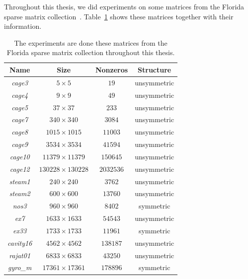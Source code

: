 \documentclass[12pt, twoside]{book}
\begin{document}
Throughout this thesis, we did experiments on some matrices from the Florida sparse
matrix collection~\cite{florida.matrices}. Table~\ref{florida.mats} shows these matrices
together with their information.

\begin{table}
\centering
\begin{tabular}{|c|c|c|c|}
\hline
Name & Size & Nonzeros & Structure\\\hline
\textit{cage3} & $5\times 5$ & $19$ & unsymmetric\\\hline
\textit{cage4} & $9\times 9$ & $49$ & unsymmetric\\\hline
\textit{cage5} & $37\times 37$ & $233$ & unsymmetric\\\hline
\textit{cage7} & $340\times 340$  & $3084$ & unsymmetric\\\hline
\textit{cage8} & $1015\times 1015$  & $11003$ & unsymmetric\\\hline
\textit{cage9} & $3534\times 3534$  & $41594$ & unsymmetric\\\hline
\textit{cage10} & $11379\times 11379$ & $150645$& unsymmetric\\\hline
\textit{cage12} & $130228\times 130228$ &  $2032536$ & unsymmetric\\\hline
\textit{steam1} & $240\times 240$ & $3762$ & unsymmetric \\\hline
\textit{steam2} & $600\times 600$ & $13760$ & unsymmetric \\\hline
\textit{nos3} & $960\times 960$ & $8402$ & symmetric \\\hline
\textit{ex7} & $1633\times 1633$ & $54543$ & unsymmetric \\\hline 
\textit{ex33} & $1733\times 1733$ & $11961$ & symmetric\\\hline
\textit{cavity16} & $4562\times 4562$ & $138187$ & unsymmetric \\\hline
\textit{rajat01} & $6833\times 6833$ & $43250$ & unsymmetric\\\hline
\textit{gyro\_m} & $17361\times 17361$ & $178896$ & symmetric\\\hline
\end{tabular}

\caption{The experiments are done these matrices 
from the Florida sparse matrix collection throughout this thesis.}
\label{florida.mats}
\end{table}
\end{document}
